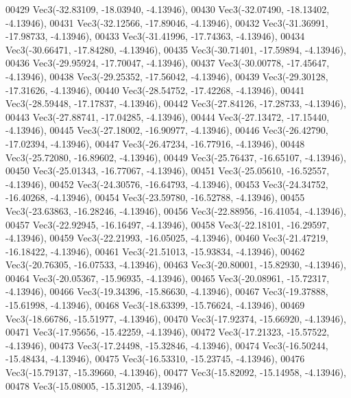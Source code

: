 \begin{DoxyCode}
00429         Vec3(-32.83109, -18.03940, -4.13946),
00430         Vec3(-32.07490, -18.13402, -4.13946),
00431         Vec3(-32.12566, -17.89046, -4.13946),
00432         Vec3(-31.36991, -17.98733, -4.13946),
00433         Vec3(-31.41996, -17.74363, -4.13946),
00434         Vec3(-30.66471, -17.84280, -4.13946),
00435         Vec3(-30.71401, -17.59894, -4.13946),
00436         Vec3(-29.95924, -17.70047, -4.13946),
00437         Vec3(-30.00778, -17.45647, -4.13946),
00438         Vec3(-29.25352, -17.56042, -4.13946),
00439         Vec3(-29.30128, -17.31626, -4.13946),
00440         Vec3(-28.54752, -17.42268, -4.13946),
00441         Vec3(-28.59448, -17.17837, -4.13946),
00442         Vec3(-27.84126, -17.28733, -4.13946),
00443         Vec3(-27.88741, -17.04285, -4.13946),
00444         Vec3(-27.13472, -17.15440, -4.13946),
00445         Vec3(-27.18002, -16.90977, -4.13946),
00446         Vec3(-26.42790, -17.02394, -4.13946),
00447         Vec3(-26.47234, -16.77916, -4.13946),
00448         Vec3(-25.72080, -16.89602, -4.13946),
00449         Vec3(-25.76437, -16.65107, -4.13946),
00450         Vec3(-25.01343, -16.77067, -4.13946),
00451         Vec3(-25.05610, -16.52557, -4.13946),
00452         Vec3(-24.30576, -16.64793, -4.13946),
00453         Vec3(-24.34752, -16.40268, -4.13946),
00454         Vec3(-23.59780, -16.52788, -4.13946),
00455         Vec3(-23.63863, -16.28246, -4.13946),
00456         Vec3(-22.88956, -16.41054, -4.13946),
00457         Vec3(-22.92945, -16.16497, -4.13946),
00458         Vec3(-22.18101, -16.29597, -4.13946),
00459         Vec3(-22.21993, -16.05025, -4.13946),
00460         Vec3(-21.47219, -16.18422, -4.13946),
00461         Vec3(-21.51013, -15.93834, -4.13946),
00462         Vec3(-20.76305, -16.07533, -4.13946),
00463         Vec3(-20.80001, -15.82930, -4.13946),
00464         Vec3(-20.05367, -15.96935, -4.13946),
00465         Vec3(-20.08961, -15.72317, -4.13946),
00466         Vec3(-19.34396, -15.86630, -4.13946),
00467         Vec3(-19.37888, -15.61998, -4.13946),
00468         Vec3(-18.63399, -15.76624, -4.13946),
00469         Vec3(-18.66786, -15.51977, -4.13946),
00470         Vec3(-17.92374, -15.66920, -4.13946),
00471         Vec3(-17.95656, -15.42259, -4.13946),
00472         Vec3(-17.21323, -15.57522, -4.13946),
00473         Vec3(-17.24498, -15.32846, -4.13946),
00474         Vec3(-16.50244, -15.48434, -4.13946),
00475         Vec3(-16.53310, -15.23745, -4.13946),
00476         Vec3(-15.79137, -15.39660, -4.13946),
00477         Vec3(-15.82092, -15.14958, -4.13946),
00478         Vec3(-15.08005, -15.31205, -4.13946),

\end{DoxyCode}
